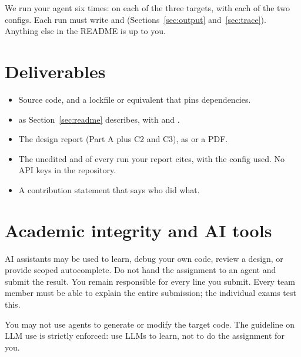 \documentclass[9pt,letterpaper]{article}
\begin{document}
We run your agent six times: on each of the three targets, with each of the two
configs. Each run must write  and 
(Sections~\ref{sec:output} and~\ref{sec:trace}). Anything else in the README is
up to you.

\section{Deliverables}
\begin{itemize}
\item Source code, and a lockfile or equivalent that pins dependencies.
\item {} as Section~\ref{sec:readme} describes, with
   and .
\item The design report (Part A plus C2 and C3), as  or a PDF.
\item The unedited  and  of every run
  your report cites, with the config used. No API keys in the repository.
\item A contribution statement that says who did what.
\end{itemize}

\section{Academic integrity and AI tools}

AI assistants may be used to learn, debug your own code, review a design, or
provide scoped autocomplete. Do not hand the assignment to an agent and submit
the result. You remain responsible for every line you submit. Every team member
must be able to explain the entire submission; the individual exams test this.

You may not use agents to generate or modify the target code. The guideline on
LLM use is strictly enforced: use LLMs to learn, not to do the assignment for
you.
\end{document}
